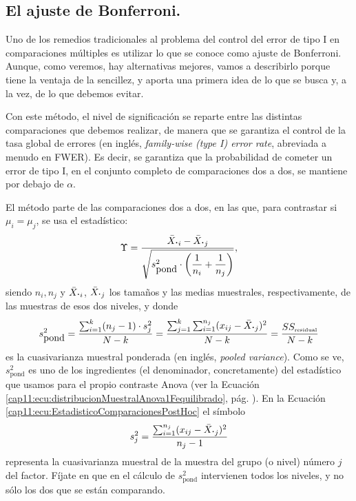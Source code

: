 \subsection{El ajuste de Bonferroni.}
\label{cap11:subsec:Bonferroni}

Uno de los remedios tradicionales al problema del control del error de tipo I en comparaciones múltiples es utilizar lo que se conoce como {\sf ajuste de Bonferroni}. Aunque, como veremos, hay alternativas mejores, vamos a describirlo porque tiene la ventaja de la sencillez, y aporta una primera idea de lo que se busca y, a la vez, de lo que debemos evitar.

Con este método, el nivel de significación se reparte entre las distintas comparaciones que debemos realizar, de manera que se garantiza el control de la {\sf tasa global de errores} (en inglés, {\em family-wise (type I) error rate}, abreviada a menudo en {\sf FWER}). Es decir, se garantiza que la probabilidad de cometer un error de tipo I, en el conjunto completo de comparaciones dos a dos, se mantiene por debajo de $\alpha$.

El método parte de las comparaciones dos a dos, en las que, para contrastar si $\mu_i=\mu_j$, se usa el estadístico:
\begin{equation}
\label{cap11:ecu:EstadisticoComparacionesPostHoc}
\Upsilon=
\dfrac{\bar X_{{\mbox{\bf\large$\cdot$}}i}-\bar X_{{\mbox{\bf\large$\cdot$}}j}}{
{\sqrt{s_{\mbox{pond}}^2\cdot\left(\dfrac{1}{n_i}+\dfrac{1}{n_j}\right)}}},
\end{equation}
siendo $n_i, n_j$ y $\bar X_{{\mbox{\bf\large$\cdot$}}i}$, $\bar X_{{\mbox{\bf\large$\cdot$}}j}$ los tamaños y las medias muestrales, respectivamente,  de las muestras de esos dos niveles, y donde
\begin{equation}
\label{cap11:ecu:CuasivarianzaPonderadaComparacionesPostHoc}
s_{\mbox{pond}}^2=\dfrac{\sum_{i=1}^k (n_j-1)\cdot s_j^2}{N-k}=
\dfrac{\sum_{j=1}^k\sum_{i=1}^{n_j}(x_{ij}-\bar X_{\mbox{\bf\large $\cdot$}j})^2}{N-k}
=\dfrac{SS_{\mbox{\tiny residual}}}{N-k}
\end{equation}
es la {\sf cuasivarianza muestral ponderada} (en inglés, {\em pooled variance}). Como se ve, $s_{\mbox{pond}}^2$ es uno de los ingredientes (el denominador, concretamente) del estadístico que usamos para el propio contraste Anova (ver la Ecuación \ref{cap11:ecu:distribucionMuestralAnova1Fequilibrado}, pág. \pageref{cap11:ecu:distribucionMuestralAnova1Fequilibrado}).  En la Ecuación \ref{cap11:ecu:EstadisticoComparacionesPostHoc} el símbolo
\[
s_j^2=\dfrac{\sum_{i=1}^{n_j}(x_{ij}-\bar X_{\mbox{\bf\large $\cdot$}j})^2}{n_j-1}
\]
representa la cuasivarianza muestral de la muestra del grupo (o nivel) número $j$ del factor. Fíjate en que en el cálculo de $s_{\mbox{pond}}^2$ intervienen todos los niveles, y no sólo los dos que se están comparando.

